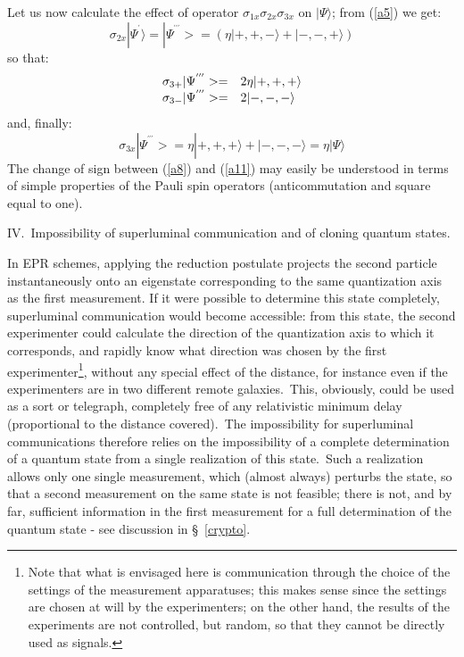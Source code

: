 \documentclass[12pt,onecolumn]{article}%
\begin{document}
Let us now calculate the effect of operator $\sigma_{1x}\sigma_{2x}\sigma
_{3x}$ on $|\Psi\rangle $; from (\ref{a5}) we get:
\begin{equation}
\sigma_{2x}|\Psi^{^{\prime}}\rangle =|\Psi^{^{\prime\prime\prime}}>=\left(
\eta|+,+,-\rangle +|-,-,+\rangle \right)  \label{a9}%
\end{equation}
so that:
\begin{equation}%
\begin{array}
[c]{ll}%
\sigma_{3+}|\Psi^{^{\prime\prime\prime}}>= & 2\eta|+,+,+\rangle \\
\sigma_{3-}|\Psi^{^{\prime\prime\prime}}>= & 2|-,-,-\rangle 
\end{array}
\label{a10}%
\end{equation}
and, finally:
\begin{equation}
\sigma_{3x}|\Psi^{^{\prime\prime\prime}}>=\eta|+,+,+\rangle +|
-,-,-\rangle =\eta|\Psi\rangle  \label{a11}%
\end{equation}
The change of sign between (\ref{a8}) and (\ref{a11}) may easily be understood
in terms of simple properties of the Pauli spin operators (anticommutation and
square equal to one).

\begin{center}
\bigskip\bigskip

\bigskip\bigskip IV.\ Impossibility of superluminal communication and of
cloning quantum states.
\end{center}

In EPR schemes, applying the reduction postulate projects the second particle
instantaneously onto an eigenstate corresponding to the same quantization axis
as the first measurement. If it were possible to determine this state
completely, superluminal communication would become accessible: from this
state, the second experimenter could calculate the direction of the
quantization axis to which it corresponds, and rapidly know what direction was
chosen by the first experimenter\footnote{Note that what is envisaged here is
communication through the choice of the settings of the measurement
apparatuses; this makes sense since the settings are chosen at will by the
experimenters; on the other hand, the results of the experiments are not
controlled, but random, so that they cannot be directly used as signals.},
without any special effect of the distance, for instance even if the
experimenters are in two different remote galaxies.\ This, obviously, could be
used as a sort or telegraph, completely free of any relativistic minimum delay
(proportional to the distance covered).\ The impossibility for superluminal
communications therefore relies on the impossibility of a complete
determination of a quantum state from a single realization of this
state.\ Such a realization allows only one single measurement, which (almost
always) perturbs the state, so that a second measurement on the same state is
not feasible; there is not, and by far, sufficient information in the first
measurement for a full determination of the quantum state - see discussion in
\S \ \ref{crypto}.
\end{document}
